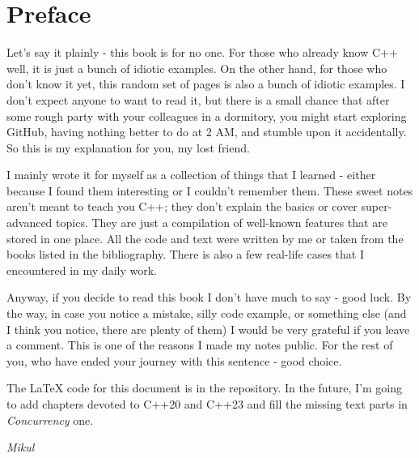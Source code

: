 \documentclass[../main]{subfiles}
\begin{document}
\chapter*{Preface}
    Let's say it plainly - this book is for no one. For those who
already know C++ well, it is just a bunch of idiotic examples. 
On the other hand, for those who don't know it yet, this random set of pages
is also a bunch of idiotic examples. I don't expect anyone to want to
read it, but there is a small chance that after some rough party
with your colleagues in a dormitory, you might start exploring GitHub,
having nothing better to do at 2 AM, and stumble upon it accidentally.
So this is my explanation for you, my lost friend.\newline

    I mainly wrote it for myself as a collection of things that I learned -
either because I found them interesting or I couldn't remember them.
These sweet notes aren't meant to teach you C++; they don't
explain the basics or cover super-advanced topics. They are just a compilation
of well-known features that are stored in one place. All the code and text
were written by me or taken from the books listed in the bibliography.
There is also a few real-life cases that I encountered in my daily work.\newline

    Anyway, if you decide to read this book I don't have much to say - good luck.
By the way, in case you notice a mistake, silly code example, or something
else (and I think you notice, there are plenty of them) I would be very
grateful if you leave a comment. This is one of the reasons I made
my notes public. For the rest of you, who have ended your journey with this
sentence - good choice.\newline

   The \LaTeX\vspace{1pt} code for this document is in the repository.
In the future, I'm going to add chapters devoted to C++20 and C++23 and
fill the missing text parts in \textit{Concurrency} one.

\begin{flushright}
    \textit{Mikul}
\end{flushright}
\end{document}
